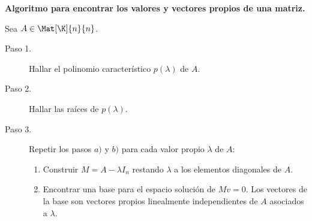 \documentclass[compacto,10pt]{pubciencias-notas}
\begin{document}

\begin{advertencia}
\textbf{Algoritmo para encontrar los valores y vectores propios de una matriz.}

Sea $A\in\Mat[\K]{n}{n}$.
\begin{description}
    \item[Paso 1.] Hallar el polinomio característico $p(\lambda)$ de $A$.
    \item[Paso 2.] Hallar las raíces de $p(\lambda)$.
    \item[Paso 3.] Repetir los pasos $a)$ y $b)$ para cada valor propio $\lambda$ de $A$:
        \begin{enumerate}
            \item[$a)$] Construir $M = A - \lambda I_{n}$ restando $\lambda$ a los elementos diagonales de $A$.
            \item[$b)$] Encontrar una base para el espacio solución de $Mv = 0$. Los vectores de la base son vectores propios linealmente independientes de $A$ asociados a $\lambda$.
        \end{enumerate}
\end{description}
\end{advertencia}
\end{document}
